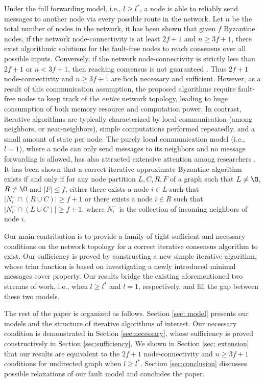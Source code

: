 \documentclass[letterpaper, 11pt]{article}
\begin{document}
Under the full forwarding model, i.e., $l\ge l^*$, a node is able to reliably send messages to another node via every possible route in the network. Let $n$ be the total number of nodes in the network, it has been shown that given $f$ Byzantine nodes, if the network node-connectivity is at least $2f+1$ and $n\ge 3f+1$, there exist algorithmic solutions for the fault-free nodes to reach consensus over all possible inputs. Conversely, if the network node-connectivity is strictly less than $2f+1$ or $n<3f+1$, then reaching consensus is not guaranteed \cite{impossible_proof_lynch}. Thus $2f+1$ node-connectivity and $n\ge 3f+1$ are both necessary and sufficient.
However,  as a result of this communication assumption, the proposed algorithms require fault-free nodes to keep track of the \emph{entire} network topology, leading to huge consumption of both memory resource and computation power.
In contrast, iterative algorithms are typically characterized by local communication (among neighbors, or near-neighbors), simple computations performed repeatedly, and a small amount of state per node.
The purely local communication model (i.e., $l=1$), where a node can only send messages to its neighbors and no message forwarding is allowed, has also attracted extensive attention among researchers \cite{Benezit, leblanc_HiCoNs,jadbabaie_concensus,Vaidya2012IABC,Vaidyamatrix, vaidyaII}.
It has been shown that a correct iterative approximate Byzantine algorithm exists if and only if for any node partition $L, C, R, F$ of a graph such that $L\not=\O$, $R\not=\O$ and $|F|\le f$, either there exists a node $i\in L$ such that $|N_i^{-}\cap (R\cup C)|\ge f+1$ or there exists a node $i\in R$ such that $|N_i^{-}\cap (L\cup C)|\ge f+1$, where $N_i^{-}$ is the collection of incoming neighbors of node $i$.


 Our main contribution is to provide a family of tight sufficient and necessary conditions on the network topology for a correct iterative consensus algorithm to exist. Our sufficiency is proved by constructing a new simple iterative algorithm, whose trim function is based on investigating a newly introduced minimal messages cover property.
Our results bridge the existing aforementioned two streams of work, i.e., when $l\ge l^*$ and $l=1$, respectively, and fill the gap between these two models.






The rest of the paper is  organized as follows. Section \ref{sec: model} presents our models and the structure of iterative algorithms of interest. Our necessary condition is demonstrated in Section \ref{sec:necessary}, whose sufficiency is proved constructively in Section \ref{sec:sufficiency}. We shown in Section \ref{sec: extension} that our results are equivalent to the $2f+1$ node-connectivity and $n\ge 3f+1$ conditions for undirected graph when $l\ge l^*$. Section \ref{sec:conclusion} discusses possible relaxations of our fault model and concludes the paper.
\end{document}
